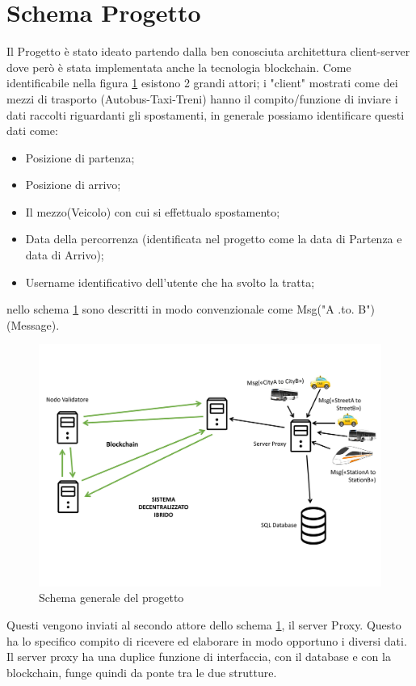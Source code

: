 \documentclass[11pt,a4paper,titlepage, twoside, openright]{report}
\begin{document}
\section{Schema Progetto}\label{Schema-Progetto}
Il Progetto è stato ideato partendo dalla ben conosciuta architettura client-server dove però è stata implementata anche la tecnologia blockchain. Come identificabile nella figura \ref{fig:sch} esistono 2 grandi attori; i "client" mostrati come dei mezzi di trasporto (Autobus-Taxi-Treni) hanno il compito/funzione di inviare i dati raccolti riguardanti gli spostamenti, in generale possiamo identificare questi dati come: 
\begin{itemize}
\item Posizione di partenza;
\item Posizione di arrivo;
\item Il mezzo(Veicolo) con cui si effettualo spostamento;
\item Data della percorrenza (identificata nel progetto come la data di Partenza e data di Arrivo);
\item Username identificativo dell'utente che ha svolto la tratta;
\end{itemize}
nello schema \ref{fig:sch} sono descritti in modo convenzionale come Msg("A .to. B") (Message).
\begin{figure}[h]
	\includegraphics[width=\textwidth]{Schema_Progetto}
	\centering
	\caption{Schema generale del progetto}
	\label{fig:sch}
\end{figure}

Questi vengono inviati al secondo attore dello schema \ref{fig:sch}, il server Proxy. Questo ha lo specifico compito di ricevere ed elaborare in modo opportuno i diversi dati. Il server proxy ha una duplice funzione di interfaccia, con il database e con la blockchain, funge quindi da ponte tra le due strutture.
\end{document}
